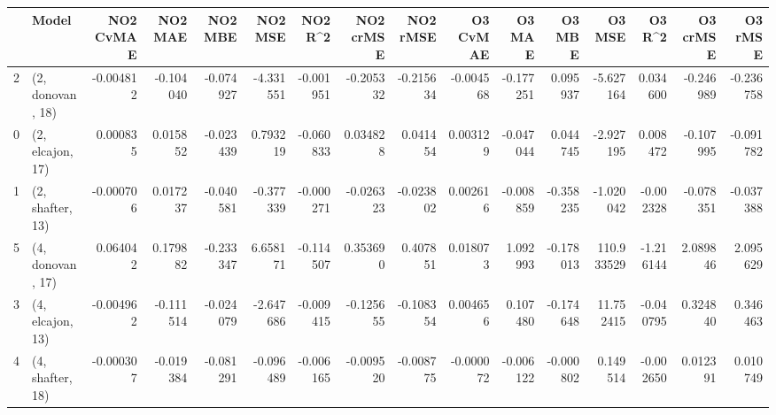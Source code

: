 \begin{tabular}{llrrrrrrrrrrrrrr}
\toprule
{} &             Model &  NO2 CvMAE &   NO2 MAE &   NO2 MBE &   NO2 MSE &   NO2 R\textasciicircum2 &  NO2 crMSE &  NO2 rMSE &  O3 CvMAE &    O3 MAE &    O3 MBE &      O3 MSE &    O3 R\textasciicircum2 &  O3 crMSE &   O3 rMSE \\
\midrule
2 &  (2, donovan, 18) &  -0.004812 & -0.104040 & -0.074927 & -4.331551 & -0.001951 &  -0.205332 & -0.215634 & -0.004568 & -0.177251 &  0.095937 &   -5.627164 &  0.034600 & -0.246989 & -0.236758 \\
0 &  (2, elcajon, 17) &   0.000835 &  0.015852 & -0.023439 &  0.793219 & -0.060833 &   0.034828 &  0.041454 &  0.003129 & -0.047044 &  0.044745 &   -2.927195 &  0.008472 & -0.107995 & -0.091782 \\
1 &  (2, shafter, 13) &  -0.000706 &  0.017237 & -0.040581 & -0.377339 & -0.000271 &  -0.026323 & -0.023802 &  0.002616 & -0.008859 & -0.358235 &   -1.020042 & -0.002328 & -0.078351 & -0.037388 \\
5 &  (4, donovan, 17) &   0.064042 &  0.179882 & -0.233347 &  6.658171 & -0.114507 &   0.353690 &  0.407851 &  0.018073 &  1.092993 & -0.178013 &  110.933529 & -1.216144 &  2.089846 &  2.095629 \\
3 &  (4, elcajon, 13) &  -0.004962 & -0.111514 & -0.024079 & -2.647686 & -0.009415 &  -0.125655 & -0.108354 &  0.004656 &  0.107480 & -0.174648 &   11.752415 & -0.040795 &  0.324840 &  0.346463 \\
4 &  (4, shafter, 18) &  -0.000307 & -0.019384 & -0.081291 & -0.096489 & -0.006165 &  -0.009520 & -0.008775 & -0.000072 & -0.006122 & -0.000802 &    0.149514 & -0.002650 &  0.012391 &  0.010749 \\
\bottomrule
\end{tabular}
